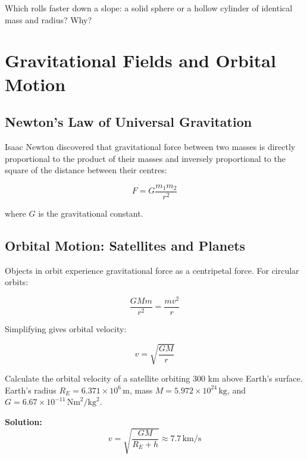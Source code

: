 \begin{stopandthink}
Which rolls faster down a slope: a solid sphere or a hollow cylinder of identical mass and radius? Why?
\end{stopandthink}

\FloatBarrier

\section{Gravitational Fields and Orbital Motion}
\FloatBarrier

\subsection{Newton's Law of Universal Gravitation}
\FloatBarrier

Isaac Newton discovered that gravitational force between two masses is directly proportional to the product of their masses and inversely proportional to the square of the distance between their centres:

\[
F = G \frac{m_1 m_2}{r^2}
\]

where \(G\) is the gravitational constant.


\subsection{Orbital Motion: Satellites and Planets}
\FloatBarrier

Objects in orbit experience gravitational force as a centripetal force. For circular orbits:

\[
\frac{GMm}{r^2} = \frac{mv^2}{r}
\]

Simplifying gives orbital velocity:

\[
v = \sqrt{\frac{GM}{r}}
\]


\begin{example}
Calculate the orbital velocity of a satellite orbiting 300 km above Earth's surface. Earth's radius \( R_E = 6.371 \times 10^6\,\text{m} \), mass \(M = 5.972 \times 10^{24}\,\text{kg}\), and \(G = 6.67 \times 10^{-11}\,\text{Nm}^2/\text{kg}^2\).

\textbf{Solution:}
\[
v = \sqrt{\frac{GM}{R_E + h}} \approx 7.7\,\text{km/s}
\]
\end{example}

